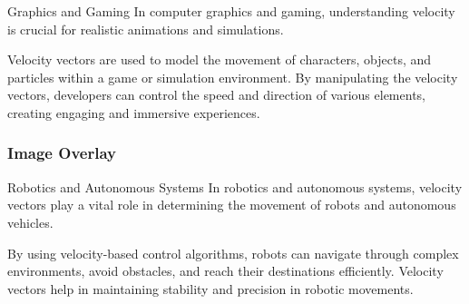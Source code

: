 \documentclass{beamer}
\begin{document}
\begin{frame}[t]{Graphics and Gaming}
\vspace{15pt}
In computer graphics and gaming, understanding velocity is crucial for realistic animations and simulations.

Velocity vectors are used to model the movement of characters, objects, and particles within a game or simulation environment. By manipulating the velocity vectors, developers can control the speed and direction of various elements, creating engaging and immersive experiences.
\end{frame}


\begin{frame}[plain]
        \frametitle{Image Overlay}
    
\end{frame}

\begin{frame}[t]{Robotics and Autonomous Systems}
\vspace{15pt}
In robotics and autonomous systems, velocity vectors play a vital role in determining the movement of robots and autonomous vehicles.

By using velocity-based control algorithms, robots can navigate through complex environments, avoid obstacles, and reach their destinations efficiently. Velocity vectors help in maintaining stability and precision in robotic movements.
\end{frame}
\end{document}
